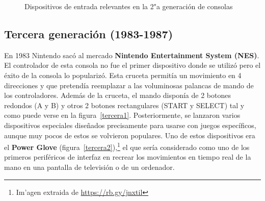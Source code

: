\begin{figure}[t]
     \hfill
\hfill
     \caption{Dispositivos de entrada relevantes en la 2"a  generaci\'on de consolas}
     \label{fig:segunda}
   \end{figure}

\subsection{Tercera generaci\'on (1983-1987)}


En 1983 Nintendo sac\'o al mercado \textbf{Nintendo Entertainment System (NES)}. El controlador de esta consola no fue el primer dispositivo donde se utiliz\'o pero el \'exito de la consola lo populariz\'o. Esta cruceta permit\'ia un movimiento en 4 direcciones y que pretend\'ia reemplazar a las voluminosas palancas de mando de los controladores. Adem\'as de la cruceta, el mando dispon\'ia de 2 botones redondos (A y B) y otros 2 botones rectangulares (START y SELECT) tal y como puede verse en la figura~\ref{tercera1}. Posteriormente, se lanzaron varios dispositivos especiales dise\~nados precisamente para usarse con juegos espec\'ificos, aunque muy pocos de estos se volvieron populares. Uno de estos dispositivos era el \textbf{Power Glove} (figura~\ref{tercera2}),\footnote{Im'agen extraida de \url{https://rb.gy/jnxtil}} el que ser\'ia considerado como uno de los primeros perif\'ericos de interfaz en recrear los movimientos en tiempo real de la mano en una pantalla de televisi\'on o de un ordenador. \\

